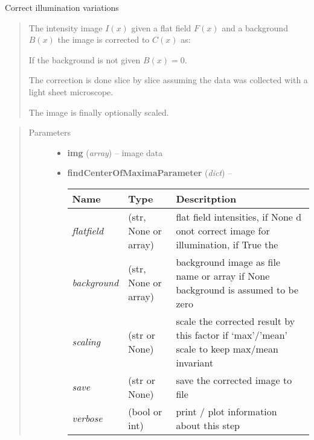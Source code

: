 \documentclass[letterpaper,10pt,english]{sphinxmanual}
\begin{document}
\begin{fulllineitems}
\label{api/ClearMap.ImageProcessing:ClearMap.ImageProcessing.IlluminationCorrection.correctIllumination}
Correct illumination variations
\begin{quote}

The intensity image \(I(x)\) given a flat field \(F(x)\) and
a background \(B(x)\) the image is corrected to \(C(x)\) as:

If the background is not given \(B(x) = 0\).

The correction is done slice by slice assuming the data was collected with
a light sheet microscope.

The image is finally optionally scaled.
\end{quote}
\begin{quote}\begin{description}
\item[{Parameters}] \leavevmode\begin{itemize}
\item {} 
\textbf{img} (\emph{array}) --
image data

\item {} 
\textbf{findCenterOfMaximaParameter} (\emph{dict}) --

\begin{tabulary}{\linewidth}{|L|L|L|}
\hline
\textsf{\relax 
Name
} & \textsf{\relax 
Type
} & \textsf{\relax 
Descritption
}\\
\hline
\emph{flatfield}
 & 
(str, None or array)
 & 
flat field intensities, if None d onot correct image for
illumination, if True the
\\
\hline
\emph{background}
 & 
(str, None or array)
 & 
background image as file name or array
if None background is assumed to be zero
\\
\hline
\emph{scaling}
 & 
(str or None)
 & 
scale the corrected result by this factor
if `max'/'mean' scale to keep max/mean invariant
\\
\hline
\emph{save}
 & 
(str or None)
 & 
save the corrected image to file
\\
\hline
\emph{verbose}
 & 
(bool or int)
 & 
print / plot information about this step
\\
\hline\end{tabulary}



\end{itemize}
\end{description}
\end{quote}
\end{fulllineitems}
\end{document}
